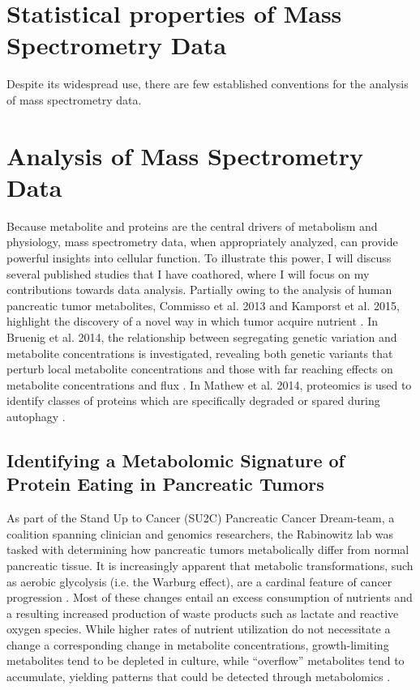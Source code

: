 \section{Statistical properties of Mass Spectrometry Data}

Despite its widespread use, there are few established conventions for the analysis of mass spectrometry data.  





\section{Analysis of Mass Spectrometry Data}

Because metabolite and proteins are the central drivers of metabolism and physiology, mass spectrometry data, when appropriately analyzed, can provide powerful insights into cellular function.  To illustrate this power, I will discuss several published studies that I have coathored, where I will focus on my contributions towards data analysis. Partially owing to the analysis of human pancreatic tumor metabolites, Commisso et al. 2013 and Kamporst et al. 2015, highlight the discovery of a novel way in which tumor acquire nutrient \cite{Commisso:2013hz, Kamphorst:2015cc}.  In Bruenig et al. 2014, the relationship between segregating genetic variation and metabolite concentrations is investigated, revealing both genetic variants that perturb local metabolite concentrations and those with far reaching effects on metabolite concentrations and flux \cite{Breunig:2014bu}.  In Mathew et al. 2014, proteomics is used to identify classes of proteins which are specifically degraded or spared during autophagy \cite{Mathew:2014hz}.


\subsection{Identifying a Metabolomic Signature of Protein Eating in Pancreatic Tumors}

As part of the Stand Up to Cancer (SU2C) Pancreatic Cancer Dream-team, a coalition spanning clinician and genomics researchers, the Rabinowitz lab was tasked with determining how pancreatic tumors metabolically differ from normal pancreatic tissue.  It is increasingly apparent that metabolic transformations, such as aerobic glycolysis (i.e. the Warburg effect), are a cardinal feature of cancer progression \cite{VanderHeiden:2009gq, Hanahan:2011gu}.  Most of these changes entail an excess consumption of nutrients and a resulting increased production of waste products such as lactate and reactive oxygen species.  While higher rates of nutrient utilization do not necessitate a change a corresponding change in metabolite concentrations, growth-limiting metabolites tend to be depleted in culture, while ``overflow'' metabolites tend to accumulate, yielding patterns that could be detected through metabolomics \cite{Boer:2010fb}.

